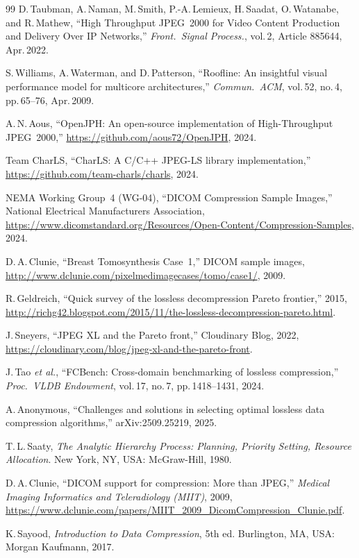 \documentclass[journal]{IEEEtran}
\begin{document}
\begin{thebibliography}{99}
D.\,Taubman, A.\,Naman, M.\,Smith, P.-A.\,Lemieux, H.\,Saadat, O.\,Watanabe,
and R.\,Mathew,
``High Throughput JPEG~2000 for Video Content Production and Delivery Over IP
Networks,''
\textit{Front.\ Signal Process.}, vol.\,2, Article 885644, Apr.\,2022.

S.\,Williams, A.\,Waterman, and D.\,Patterson,
``Roofline: An insightful visual performance model for multicore
architectures,''
\textit{Commun.\ ACM}, vol.\,52, no.\,4, pp.\,65--76, Apr.\,2009.

A.\,N.\,Aous,
``OpenJPH: An open-source implementation of High-Throughput JPEG~2000,''
\url{https://github.com/aous72/OpenJPH}, 2024.

Team CharLS,
``CharLS: A C/C++ JPEG-LS library implementation,''
\url{https://github.com/team-charls/charls}, 2024.

NEMA Working Group~4 (WG-04),
``DICOM Compression Sample Images,''
National Electrical Manufacturers Association,
\url{https://www.dicomstandard.org/Resources/Open-Content/Compression-Samples},
2024.

D.\,A.\,Clunie,
``Breast Tomosynthesis Case~1,'' DICOM sample images,
\url{http://www.dclunie.com/pixelmedimagecases/tomo/case1/}, 2009.

R.\,Geldreich, ``Quick survey of the lossless decompression Pareto frontier,''
2015, \url{http://richg42.blogspot.com/2015/11/the-lossless-decompression-pareto.html}.

J.\,Sneyers, ``JPEG XL and the Pareto front,'' Cloudinary Blog, 2022,
\url{https://cloudinary.com/blog/jpeg-xl-and-the-pareto-front}.

J.\,Tao \textit{et al.}, ``FCBench: Cross-domain benchmarking of lossless
compression,'' \textit{Proc.\ VLDB Endowment}, vol.\,17, no.\,7,
pp.\,1418--1431, 2024.

A.\,Anonymous, ``Challenges and solutions in selecting optimal lossless data
compression algorithms,'' arXiv:2509.25219, 2025.

T.\,L.\,Saaty, \textit{The Analytic Hierarchy Process: Planning, Priority
Setting, Resource Allocation}. New York, NY, USA: McGraw-Hill, 1980.

D.\,A.\,Clunie, ``DICOM support for compression: More than JPEG,''
\textit{Medical Imaging Informatics and Teleradiology (MIIT)}, 2009,
\url{https://www.dclunie.com/papers/MIIT_2009_DicomCompression_Clunie.pdf}.

K.\,Sayood, \textit{Introduction to Data Compression}, 5th ed.
Burlington, MA, USA: Morgan Kaufmann, 2017.

\end{thebibliography}
\end{document}
